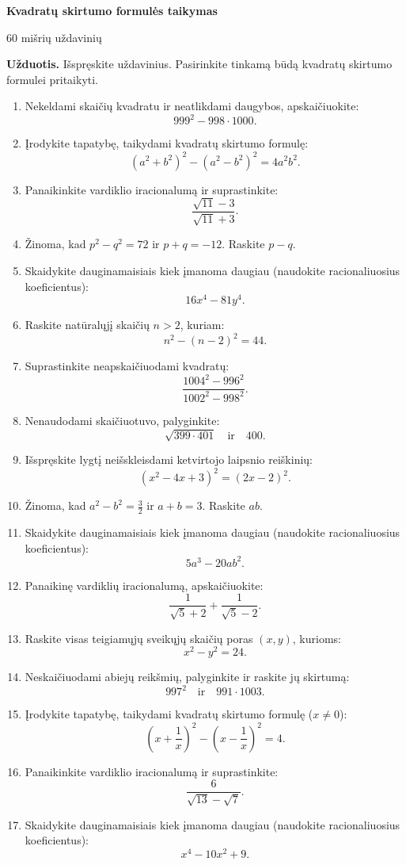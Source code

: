 \documentclass[11pt,a4paper]{article}
\begin{document}
\begin{center}
{\Large\bfseries Kvadratų skirtumo formulės taikymas}

\medskip
{\large 60 mišrių uždavinių}
\end{center}
\textbf{Užduotis.} Išspręskite uždavinius. Pasirinkite tinkamą būdą
kvadratų skirtumo formulei pritaikyti.
\medskip
\begin{enumerate}
\item Nekeldami skaičių kvadratu ir neatlikdami daugybos, apskaičiuokite:\[999^2-998\cdot1000.\]
\item Įrodykite tapatybę, taikydami kvadratų skirtumo formulę:\[(a^2+b^2)^2-(a^2-b^2)^2=4a^2b^2.\]
\item Panaikinkite vardiklio iracionalumą ir suprastinkite:\[\frac{\sqrt{11}-3}{\sqrt{11}+3}.\]
\item Žinoma, kad \(p^2-q^2=72\) ir \(p+q=-12\). Raskite \(p-q\).
\item Skaidykite dauginamaisiais kiek įmanoma daugiau (naudokite racionaliuosius koeficientus):\[16x^4-81y^4.\]
\item Raskite natūralųjį skaičių \(n>2\), kuriam:\[n^2-(n-2)^2=44.\]
\item Suprastinkite neapskaičiuodami kvadratų:\[\frac{1004^2-996^2}{1002^2-998^2}.\]
\item Nenaudodami skaičiuotuvo, palyginkite:\[\sqrt{399\cdot401}\quad\text{ir}\quad400.\]
\item Išspręskite lygtį neišskleisdami ketvirtojo laipsnio reiškinių:\[(x^2-4x+3)^2=(2x-2)^2.\]
\item Žinoma, kad \(a^2-b^2=\frac32\) ir \(a+b=3\). Raskite \(ab\).
\item Skaidykite dauginamaisiais kiek įmanoma daugiau (naudokite racionaliuosius koeficientus):\[5a^3-20ab^2.\]
\item Panaikinę vardiklių iracionalumą, apskaičiuokite:\[\frac1{\sqrt5+2}+\frac1{\sqrt5-2}.\]
\item Raskite visas teigiamųjų sveikųjų skaičių poras \((x,y)\), kurioms:\[x^2-y^2=24.\]
\item Neskaičiuodami abiejų reikšmių, palyginkite ir raskite jų skirtumą:\[997^2\quad\text{ir}\quad991\cdot1003.\]
\item Įrodykite tapatybę, taikydami kvadratų skirtumo formulę (\(x\ne0\)):\[(x+\frac1x)^2-(x-\frac1x)^2=4.\]
\item Panaikinkite vardiklio iracionalumą ir suprastinkite:\[\frac{6}{\sqrt{13}-\sqrt7}.\]
\item Skaidykite dauginamaisiais kiek įmanoma daugiau (naudokite racionaliuosius koeficientus):\[x^4-10x^2+9.\]

\end{enumerate}
\end{document}
